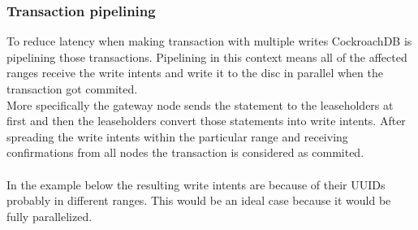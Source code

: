 \subsubsection{Transaction pipelining}
To reduce latency when making transaction with multiple writes CockroachDB is pipelining those transactions. Pipelining in this
context means all of the affected ranges receive the write intents and write it to the disc in parallel when the transaction got
commited. \\More specifically the gateway node sends the statement to the leaseholders at first and then the leaseholders convert
those statements into write intents. After spreading the write intents within the particular range and receiving confirmations
from all nodes the transaction is considered as commited.\\\\
In the example below the resulting write intents are because of their UUIDs probably in different ranges. This would be an ideal
case because it would be fully parallelized.\\\\

